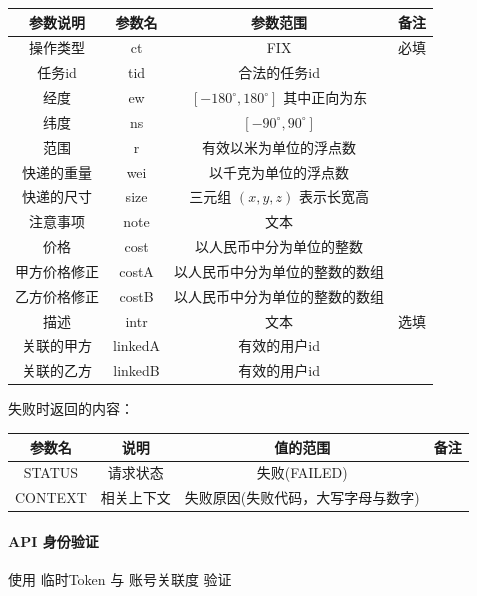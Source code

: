\documentclass[UTF8]{article}
\def\apiauth{\paragraph{\colorbox[rgb]{0.45,0.9,1}{API 身份验证}}} %
\def\失败{\colorbox[rgb]{1,0.5,0.5}{失败}}
\def\失败V{失败(FAILED)}
\def\失败原因{失败原因(失败代码，大写字母与数字)}
\begin{document}
    \begin{tabular}{|c|c|c|c|}
        \hline \rule[-2ex]{0pt}{5.5ex} 参数说明 & 参数名 & 参数范围 & 备注 \\        \hline \rule[-2ex]{0pt}{5.5ex} 操作类型 & ct & FIX & 必填 \\
        \hline \rule[-2ex]{0pt}{5.5ex} 任务id & tid & 合法的任务id &  \\
        \hline \rule[-2ex]{0pt}{5.5ex} 经度 & ew & $[-180^\circ,180^\circ]$ 其中正向为东 &  \\
        \hline \rule[-2ex]{0pt}{5.5ex} 纬度 & ns & $[-90^\circ,90^\circ]$ &  \\
        \hline \rule[-2ex]{0pt}{5.5ex} 范围 & r & 有效以米为单位的浮点数 &  \\
        \hline \rule[-2ex]{0pt}{5.5ex} 快递的重量 & wei & 以千克为单位的浮点数 &  \\
        \hline \rule[-2ex]{0pt}{5.5ex} 快递的尺寸 & size & 三元组 $(x,y,z)$ 表示长宽高 &  \\
        \hline \rule[-2ex]{0pt}{5.5ex} 注意事项 & note & 文本 &  \\
        \hline \rule[-2ex]{0pt}{5.5ex} 价格 & cost & 以人民币中分为单位的整数 &  \\
        \hline \rule[-2ex]{0pt}{5.5ex} 甲方价格修正 & costA & 以人民币中分为单位的整数的数组 &  \\
        \hline \rule[-2ex]{0pt}{5.5ex} 乙方价格修正 & costB & 以人民币中分为单位的整数的数组 &  \\
        \hline \rule[-2ex]{0pt}{5.5ex} 描述 & intr & 文本 & 选填 \\
        \hline \rule[-2ex]{0pt}{5.5ex} 关联的甲方 & linkedA & 有效的用户id &  \\
        \hline \rule[-2ex]{0pt}{5.5ex} 关联的乙方 & linkedB & 有效的用户id &  \\
        \hline 
    \end{tabular} 
    \par \失败 时返回的内容：\\
    \begin{tabular}{|c|c|c|c|}
        \hline \rule[-2ex]{0pt}{5.5ex} 参数名 & 说明 & 值的范围 & 备注 \\
        \hline \rule[-2ex]{0pt}{5.5ex} STATUS & 请求状态 & \失败V &  \\ 
        \hline \rule[-2ex]{0pt}{5.5ex} CONTEXT & 相关上下文 & \失败原因 &  \\
        \hline 
    \end{tabular}
    \apiauth
    使用 临时Token 与 账号关联度 验证
\end{document}
